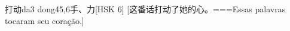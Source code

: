 \begin{EntryWithPhonetic}{打动}{da3 dong4}{5,6}{⼿、⼒}[HSK 6]
  [这番话打动了她的心。===Essas palavras tocaram seu coração.]
\end{EntryWithPhonetic}
